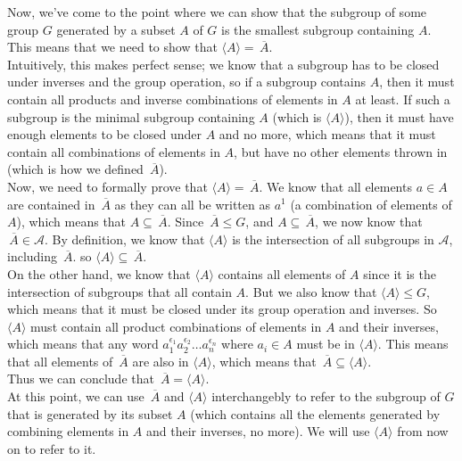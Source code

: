 \documentclass[12pt]{article}
\newcommand{\olsi}[1]{\,\overline{{#1}}}
\newcommand{\ang}[1]{\langle #1 \rangle}
\begin{document}
    Now, we've come to the point where we can show that
    the subgroup of some group $G$
    generated by a subset $A$ of $G$ 
    is the smallest subgroup containing $A$.
    This means that we need to show that $\ang{A} = \olsi{A}$. \\
    Intuitively, this makes perfect sense;
    we know that a subgroup has to be closed under inverses
    and the group operation,
    so if a subgroup contains $A$,
    then it must contain all products and inverse combinations
    of elements in $A$ at least.
    If such a subgroup is the minimal subgroup containing $A$
    (which is $\ang{A}$),
    then it must have enough elements to be closed under $A$
    and no more,
    which means that it must contain all combinations of elements
    in $A$,
    but have no other elements thrown in
    (which is how we defined $\olsi{A}$). \\
    Now, we need to formally prove that $\ang{A} = \olsi{A}$.
    We know that all elements $a \in A$
    are contained in $\olsi{A}$
    as they can all be written as $a^1$
    (a combination of elements of $A$),
    which means that $A \subseteq \olsi{A}$.
    Since $\olsi{A} \leqslant G$,
    and $A \subseteq \olsi{A}$,
    we now know that $\olsi{A} \in \mathcal{A}$. 
    By definition,
    we know that $\ang{A}$ is the intersection of all 
    subgroups in $\mathcal{A}$,
    including $\olsi{A}$.
    so $\ang{A} \subseteq \olsi{A}$. \\
    On the other hand,
    we know that $\ang{A}$ contains all elements of $A$
    since it is the intersection of subgroups that all contain $A$.
    But we also know that $\ang{A} \leqslant G$,
    which means that it must be closed under its
    group operation and inverses.
    So $\ang{A}$ must contain all product
    combinations of elements in $A$ and their inverses,
    which means that any word
    $a_1^{\epsilon_1}a_2^{\epsilon_2} \dots a_n^{\epsilon_n}$
    where $a_i \in A$
    must be in $\ang{A}$.
    This means that all elements of $\olsi{A}$
    are also in $\ang{A}$,
    which means that $\olsi{A} \subseteq \ang{A}$. \\
    Thus we can conclude that $\olsi{A} = \ang{A}$. \\

    At this point,
    we can use $\olsi{A}$ and $\ang{A}$ interchangebly
    to refer to the subgroup of $G$
    that is generated by its subset $A$
    (which contains all the elements
    generated by combining elements in $A$ and their inverses,
    no more).
    We will use $\ang{A}$ from now on to refer to it. \\
    
\end{document}
